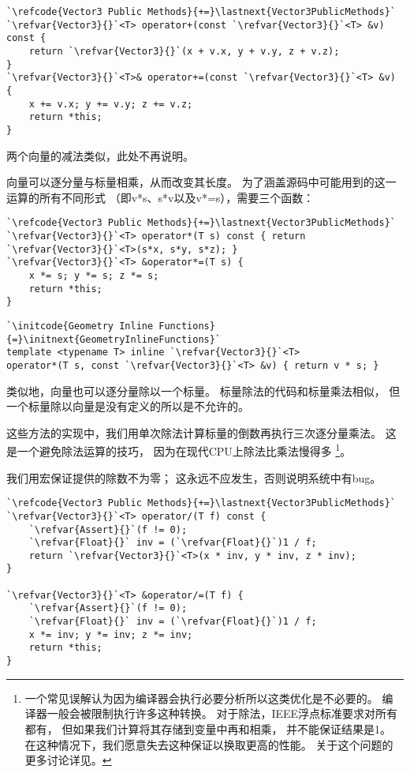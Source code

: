 \begin{lstlisting}
`\refcode{Vector3 Public Methods}{+=}\lastnext{Vector3PublicMethods}`
`\refvar{Vector3}{}`<T> operator+(const `\refvar{Vector3}{}`<T> &v) const {
    return `\refvar{Vector3}{}`(x + v.x, y + v.y, z + v.z);
}
`\refvar{Vector3}{}`<T>& operator+=(const `\refvar{Vector3}{}`<T> &v) {
    x += v.x; y += v.y; z += v.z;
    return *this;
}
\end{lstlisting}

两个向量的减法类似，此处不再说明。

向量可以逐分量与标量相乘，从而改变其长度。
为了涵盖源码中可能用到的这一运算的所有不同形式
（即{\ttfamily v*s}、{\ttfamily s*v}以及{\ttfamily v*=s}），需要三个函数：
\begin{lstlisting}
`\refcode{Vector3 Public Methods}{+=}\lastnext{Vector3PublicMethods}`
`\refvar{Vector3}{}`<T> operator*(T s) const { return `\refvar{Vector3}{}`<T>(s*x, s*y, s*z); }
`\refvar{Vector3}{}`<T> &operator*=(T s) {
    x *= s; y *= s; z *= s;
    return *this;
}
\end{lstlisting}
\begin{lstlisting}
`\initcode{Geometry Inline Functions}{=}\initnext{GeometryInlineFunctions}`
template <typename T> inline `\refvar{Vector3}{}`<T>
operator*(T s, const `\refvar{Vector3}{}`<T> &v) { return v * s; }
\end{lstlisting}

类似地，向量也可以逐分量除以一个标量。
标量除法的代码和标量乘法相似，
但一个标量除以向量是没有定义的所以是不允许的。

这些方法的实现中，我们用单次除法计算标量的倒数再执行三次逐分量乘法。
这是一个避免除法运算的技巧，
因为在现代CPU上除法比乘法慢得多
\footnote{一个常见误解认为因为编译器会执行必要分析所以这类优化是不必要的。
    编译器一般会被限制执行许多这种转换。
    对于除法，IEEE浮点标准要求对所有都有，
    但如果我们计算将其存储到变量中再和相乘，
    并不能保证结果是1。
    在这种情况下，我们愿意失去这种保证以换取更高的性能。
    关于这个问题的更多讨论详见\protect{}。}。

我们用宏保证提供的除数不为零；
这永远不应发生，否则说明系统中有bug。
\begin{lstlisting}
`\refcode{Vector3 Public Methods}{+=}\lastnext{Vector3PublicMethods}`
`\refvar{Vector3}{}`<T> operator/(T f) const {
    `\refvar{Assert}{}`(f != 0);
    `\refvar{Float}{}` inv = (`\refvar{Float}{}`)1 / f;
    return `\refvar{Vector3}{}`<T>(x * inv, y * inv, z * inv);
}

`\refvar{Vector3}{}`<T> &operator/=(T f) {
    `\refvar{Assert}{}`(f != 0);
    `\refvar{Float}{}` inv = (`\refvar{Float}{}`)1 / f;
    x *= inv; y *= inv; z *= inv;
    return *this;
}
\end{lstlisting}

